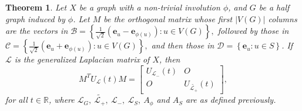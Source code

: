 \documentclass[12pt,a4paper]{article}
\newtheorem{thm}{Theorem}
\def \e {{\mathbf e}}
\newcommand{\cb}[1]{\left\lbrace #1\right\rbrace}
\begin{document}
\begin{thm}\label{T2}
Let $X$ be a graph with a non-trivial involution $\phi$, and $G$ be a half graph induced by $\phi$. Let $M$ be the orthogonal matrix whose first $|V(G)|$ columns are the vectors in $\mathcal{B}= \cb{\frac{1}{\sqrt{2} }(\e_u-\e_{\phi(u)}):u \in V(G)},$ followed by those in $\mathcal{C}=\cb{\frac{1}{\sqrt{2}}(\e_u+\e_{\phi(u)}):u \in V(G)},$ and then those in $\mathcal{D}=\cb{\e_u:u \in S}$. If $\mathscr{L}$ is the generalized Laplacian matrix of $X$, then 
\[M^T U_\mathscr{L}(t) M= \begin{bmatrix}	U_{\mathscr{L}_-}(t) & O\\	O & U_{\widetilde{\mathscr{L}_+}}(t)
\end{bmatrix},\]
for all $t \in \mathbb{R}$, where $\mathscr{L}_G,~\widetilde{\mathscr{L}_+},~\mathscr{L}_{-},~\mathscr{L}_{S}, ~A_\phi$ and $A_S$ are as defined previously.
\end{thm}
\end{document}
